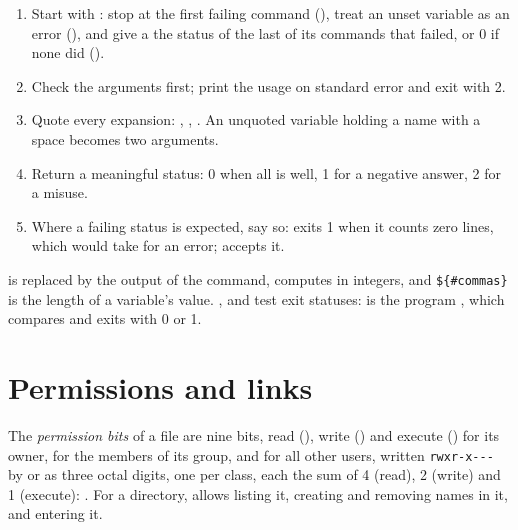 \label{out:b1:the-shell:run-check}

\begin{method}\label{met:b1:the-shell:script}
\begin{enumerate}
\item Start with : stop at the first failing command (), treat an unset variable as an
error (), and give a  the status of the last of its commands that failed, or 0 if none did
().
\item Check the arguments first; print the usage on standard error and exit with 2.
\item Quote every expansion: , , . An unquoted variable holding a name with a
space becomes two arguments.
\item Return a meaningful status: 0 when all is well, 1 for a negative answer, 2 for a misuse.
\item Where a failing status is expected, say so:  exits 1 when it counts zero lines, which 
would take for an error;  accepts it.
\end{enumerate}
\end{method}

 is replaced by the output of the command,  computes in integers, and
\texttt{\$\{\#commas\}} is the length of a variable's value. ,  and  test exit statuses:
\code{[ "$rows" -eq 0 ]} is the program \code{[}, which compares and exits with 0 or 1.

\section{Permissions and links}\label{sec:b1:the-shell:permissions}

\begin{definition}\label{def:b1:the-shell:permission-bits}
The \emph{permission bits} of a file are nine bits, read (), write () and execute
() for its owner, for the members of its group, and for all other users, written \texttt{rwxr-{}x-{}-{}-{}} by
 or as three octal digits, one per class, each the sum of 4 (read), 2 (write) and 1 (execute): .
For a directory,  allows listing it,  creating and removing names in it, and  entering it.
\end{definition}

